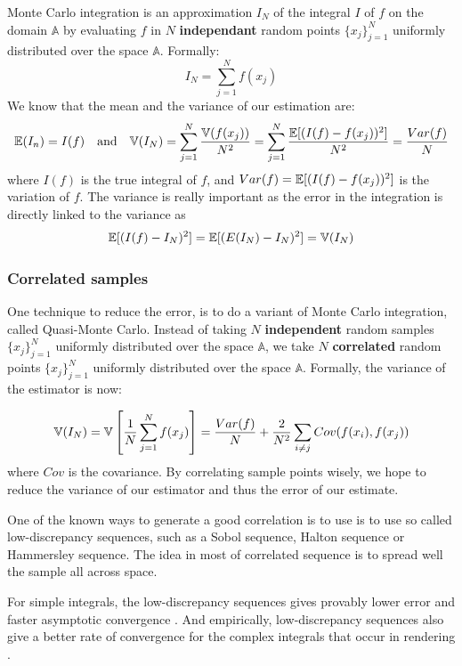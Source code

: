 \documentclass{classeENS}
\begin{document}
Monte Carlo integration is an approximation $I_N$ of the integral 
$I$ of $f$ on the domain $\mathbb A$ by evaluating $f$ in $N$ \textbf{independant} 
random points $\{x_j\}_{j=1}^N$ uniformly distributed over the 
space $\mathbb A$. Formally:
\begin{equation}
    \label{eq:montecarlo}
    I_N = \sum_{j=1}^N f(x_j)
\end{equation}
We know that the mean and the variance of our estimation are:
\begin{equation}
    \mathbb E(I_n) = I(f) \quad \text{and} \quad 
    \mathbb V(I_N) = \sum_{j=1}^N \frac{\mathbb V(f(x_j))}{N^2} = \sum_{j=1}^N\frac{\mathbb E[(I(f) - f(x_j))^2]}{N^2} = \frac{Var(f)}{N}
\end{equation}
where $I(f)$ is the true integral of $f$, and $Var(f)=\mathbb E[(I(f) - f(x_j))^2]$ is the variation of $f$. 
The variance is really important as the error in the integration is directly 
linked to the variance as
\begin{align*}   \label{eq:variance}
    \mathbb E[(I(f) - I_N)^2] = \mathbb E[(E(I_N) - I_N)^2] = \mathbb V(I_N)
\end{align*}

\subsubsection{Correlated samples}

One technique to reduce the error, is to do a variant of Monte Carlo integration, 
called Quasi-Monte Carlo. Instead of taking $N$ \textbf{independent} random samples 
$\{x_j\}_{j=1}^N$ 
uniformly distributed over the space $\mathbb A$, we take $N$ \textbf{correlated} random 
points $\{x_j\}_{j=1}^N$ uniformly distributed over the space $\mathbb A$. Formally, 
the variance of the estimator is now:
 
\[ \mathbb V(I_N) = \mathbb V\left [\frac{1}{N}\sum_{j=1}^N f(x_j) \right ] = \frac{Var(f)}{N} + \frac{2}{N^2}\sum_{i\neq j} Cov(f(x_i),f(x_j)) \]
where $Cov$ is the covariance.
By correlating sample points wisely, we hope to reduce the variance of our estimator and 
thus the error of our estimate. 

\par One of the known ways to generate a good correlation is to use is to 
use so called low-discrepancy sequences, 
such as a Sobol sequence, Halton sequence or Hammersley sequence. The 
idea in most of correlated sequence is to spread well the sample all across space.

For simple integrals, the low-discrepancy sequences gives provably lower error and 
faster asymptotic convergence \cite{10.1145/237170.237265}. And empirically, 
low-discrepancy sequences also give a better rate of convergence for the complex 
integrals that occur in rendering \cite{renderman}.
\end{document}
